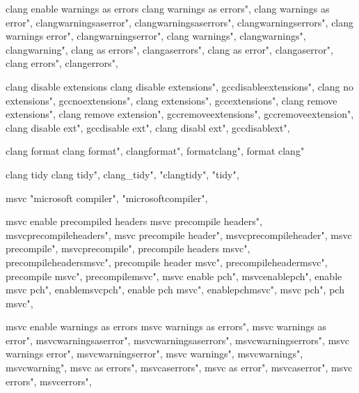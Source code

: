          clang enable warnings as errors
        clang warnings as errors", 
        clang warnings as error", 
        clangwarningsaserror", 
        clangwarningsaserrors", 
        clangwarningserrors", 
        clang warnings error", 
        clangwarningserror", 
        clang warnings", 
        clangwarnings", 
        clangwarning", 
        clang as errors", 
        clangaserrors", 
        clang as error", 
        clangaserror", 
        clang errors", 
        clangerrors", 
        
         clang disable extensions 
        clang disable extensions", 
        gccdisableextensions", 
        clang no extensions", 
        gccnoextensions", 
        clang extensions", 
        gccextensions", 
        clang remove extensions", 
        clang remove extension", 
        gccremoveextensions", 
        gccremoveextension", 
        clang disable ext", 
        gccdisable ext", 
        clang disabl ext", 
        gccdisablext", 
        
         clang format 
        clang format",
        clangformat",
        formatclang",
        format clang"
        
         clang tidy 
        clang tidy",  
        clang_tidy", "clangtidy", "tidy",  
        
         msvc  
         "microsoft compiler", "microsoftcompiler",  
        
         msvc enable precompiled headers 
        msvc precompile headers",  
        msvcprecompileheaders",  
        msvc precompile header",  
        msvcprecompileheader",  
        msvc precompile",  
        msvcprecompile",  
        precompile headers msvc",  
        precompileheadersmsvc",  
        precompile header msvc",  
        precompileheadermsvc",  
        precompile msvc",  
        precompilemsvc",  
        msvc enable pch",  
        msvcenablepch",  
        enable msvc pch",  
        enablemsvcpch",  
        enable pch msvc",  
        enablepchmsvc",  
        msvc pch",  
        pch msvc",  
        
         msvc enable warnings as errors
        msvc warnings as errors", 
        msvc warnings as error", 
        msvcwarningsaserror", 
        msvcwarningsaserrors", 
        msvcwarningserrors", 
        msvc warnings error", 
        msvcwarningserror", 
        msvc warnings", 
        msvcwarnings", 
        msvcwarning", 
        msvc as errors", 
        msvcaserrors", 
        msvc as error", 
        msvcaserror", 
        msvc errors", 
        msvcerrors", 
        
